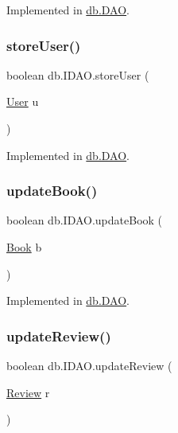 Implemented in \hyperlink{classdb_1_1_d_a_o_a036246b8124d7ac8a36e3eaafd3eb81a}{db.\+D\+AO}.

\mbox{\label{interfacedb_1_1_i_d_a_o_a5b1f408c9a25305e977e962faa38b026}} 
\subsubsection{\texorpdfstring{store\+User()}{storeUser()}}
{\footnotesize\ttfamily boolean db.\+I\+D\+A\+O.\+store\+User (\begin{DoxyParamCaption}\item[{\hyperlink{classserver_1_1data_1_1_user}{User}}]{u }\end{DoxyParamCaption})}



Implemented in \hyperlink{classdb_1_1_d_a_o_a1600c5d7d28eb225fc7c244fdfb16150}{db.\+D\+AO}.

\mbox{\label{interfacedb_1_1_i_d_a_o_a202354d7a3e1231687d543e82c15a6f5}} 
\subsubsection{\texorpdfstring{update\+Book()}{updateBook()}}
{\footnotesize\ttfamily boolean db.\+I\+D\+A\+O.\+update\+Book (\begin{DoxyParamCaption}\item[{\hyperlink{classserver_1_1data_1_1_book}{Book}}]{b }\end{DoxyParamCaption})}



Implemented in \hyperlink{classdb_1_1_d_a_o_a4ea10c177ef93a3084ed74b38556adca}{db.\+D\+AO}.

\mbox{\label{interfacedb_1_1_i_d_a_o_a7288e76ee3ce667c0d0d7ecaeef0d94e}} 
\subsubsection{\texorpdfstring{update\+Review()}{updateReview()}}
{\footnotesize\ttfamily boolean db.\+I\+D\+A\+O.\+update\+Review (\begin{DoxyParamCaption}\item[{\hyperlink{classserver_1_1data_1_1_review}{Review}}]{r }\end{DoxyParamCaption})}




